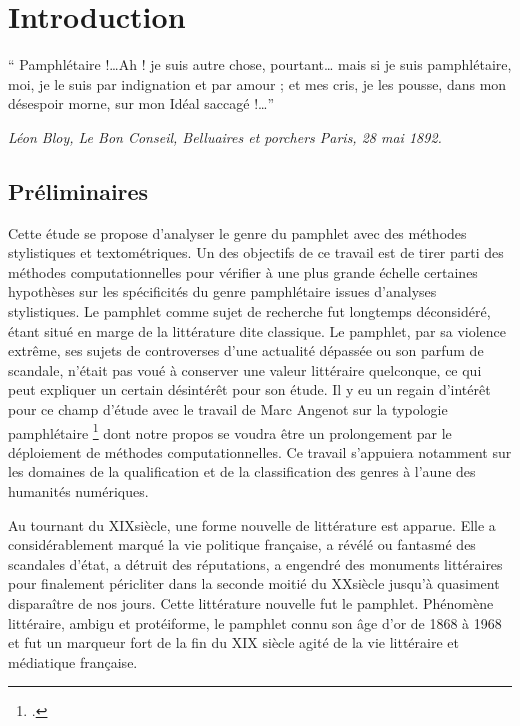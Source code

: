 \part*{Introduction}

\vspace*{\fill}
\epigraph{\enquote{  Pamphlétaire !\ldots  Ah ! je suis autre chose, pourtant… mais si je suis pamphlétaire, moi, je le suis par indignation et par amour ; et mes cris, je les pousse, dans mon désespoir morne, sur mon Idéal saccagé !\ldots  }}{\textit{Léon Bloy, Le Bon Conseil, Belluaires et porchers Paris, 28 mai 1892. }}

\vfill\clearpage
\chapter{Préliminaires}
Cette étude se propose d'analyser le genre du pamphlet avec des méthodes stylistiques et textométriques. Un des objectifs de ce travail est de tirer parti des méthodes computationnelles pour vérifier à une plus grande échelle certaines hypothèses sur les spécificités du genre pamphlétaire issues d'analyses stylistiques. Le pamphlet comme sujet de recherche fut longtemps déconsidéré, étant situé en marge de la littérature dite classique. Le pamphlet, par sa violence extrême, ses sujets de controverses d'une actualité dépassée ou son parfum de scandale, n'était pas voué à conserver une valeur littéraire quelconque, ce qui peut expliquer un certain désintérêt pour son étude. Il y eu un regain d'intérêt pour ce champ d'étude avec le travail de Marc Angenot sur la typologie pamphlétaire \footcites{angenot_parole_1982} dont notre propos se voudra être un prolongement par le déploiement de méthodes computationnelles. Ce travail s'appuiera notamment sur les domaines de la qualification et de la classification des genres à l'aune des humanités numériques.

Au tournant du XIX\ieme siècle, une forme nouvelle de littérature est apparue. Elle a considérablement marqué la vie politique française, a révélé ou fantasmé des scandales d'état, a détruit des réputations, a engendré des monuments littéraires pour finalement péricliter dans la seconde moitié du XX\ieme siècle jusqu'à quasiment disparaître de nos jours. Cette littérature nouvelle fut le pamphlet. Phénomène littéraire, ambigu et protéiforme, le pamphlet connu son âge d'or de 1868 à 1968 et fut un marqueur fort de la fin du XIX\ieme 
 siècle agité de la vie littéraire et médiatique française.

